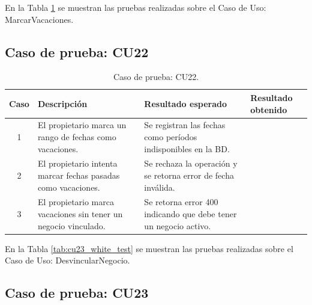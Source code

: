 
En la Tabla \ref{tab:cu22_white_test} se muestran las pruebas realizadas sobre el Caso de Uso: MarcarVacaciones.

\subsection{Caso de prueba: CU22}

\begin{table}[H]
\centering
\label{tab:cu22_white_test}
\renewcommand{\arraystretch}{1.3}
\begin{tabular}{|c|p{5cm}|p{6cm}|p{2.5cm}|}
\hline
\rowcolor[RGB]{217,217,217}
\textbf{Caso} & \textbf{Descripción} & \textbf{Resultado esperado} & \textbf{Resultado obtenido} \\
\hline

1 &
El propietario marca un rango de fechas como vacaciones. &
Se registran las fechas como períodos indisponibles en la BD. &
 \\
\hline

2 &
El propietario intenta marcar fechas pasadas como vacaciones. &
Se rechaza la operación y se retorna error de fecha inválida. &
 \\
\hline

3 &
El propietario marca vacaciones sin tener un negocio vinculado. &
Se retorna error 400 indicando que debe tener un negocio activo. &
 \\
\hline

\end{tabular}
\caption{Caso de prueba: CU22.}
\label{tab:cu22_white_test}
\end{table}


En la Tabla \ref{tab:cu23_white_test} se muestran las pruebas realizadas sobre el Caso de Uso: DesvincularNegocio.

\subsection{Caso de prueba: CU23}

